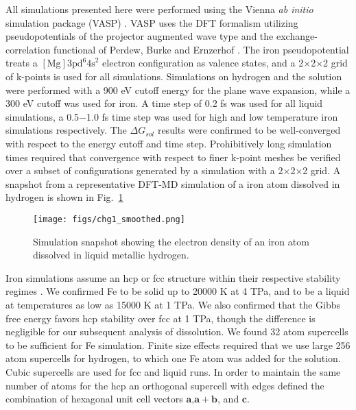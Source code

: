 All simulations presented here were performed using the Vienna {\it ab initio}
simulation package (VASP) \citep{Kresse1996}. VASP uses the DFT formalism utilizing
pseudopotentials of the projector augmented wave type \citep{Blochl1994} and the exchange-correlation
functional of Perdew, Burke and Ernzerhof \citep{Perdew1996}. The iron
pseudopotential treats a $[\mathrm{Mg}]\mathrm{3pd}^6\mathrm{4s}^2$ electron
configuration as valence states, and a 2$\times$2$\times$2
grid of k-points is used for all simulations. Simulations on hydrogen 
and the solution were performed with a 900 eV cutoff energy for the plane wave expansion, while a 300
eV cutoff was used for iron. A time step of 0.2 fs was used for all liquid simulations, a
0.5$-$1.0 fs time step  was used for high and low temperature iron simulations 
respectively. The $\Delta G_{sol}$ results were confirmed to be well-converged
with respect to the energy cutoff and time step. 
Prohibitively long simulation times required that convergence with respect to
finer k-point meshes be verified over a subset of configurations generated by
a simulation with a 2$\times$2$\times$2 grid. A snapshot from a representative DFT-MD simulation of a iron atom dissolved in hydrogen is shown in Fig.~\ref{fig:HFe_snap}

\begin{figure}[h] %
   \centering
   \texttt{[image: figs/chg1\_smoothed.png]} 
\caption{ Simulation snapshot showing the electron density of an iron atom dissolved in liquid
    metallic hydrogen.\label{fig:HFe_snap}}
\end{figure}

Iron simulations assume an hcp or fcc structure within their respective
stability regimes \citep{Pickard2009,stixrude2012}. We confirmed Fe to be solid up
to 20000 K at 4 TPa, and to be a liquid at temperatures as low as 15000 K at
1 TPa. We also confirmed that the Gibbs free energy favors hcp stability over fcc
at 1 TPa, though the difference is negligible for our subsequent analysis of
dissolution. We found 32 atom supercells to be sufficient for Fe simulation.
Finite size effects required that we use large 256 atom supercells for
hydrogen, to which one Fe atom was added for the solution. Cubic
supercells are used for fcc and liquid runs. In order to maintain the same
number of atoms for the hcp an orthogonal supercell with edges defined the combination of
hexagonal unit cell vectors $\mathbf{a}$,$\mathbf{a}+\mathbf{b}$, and
$\mathbf{c}$.

